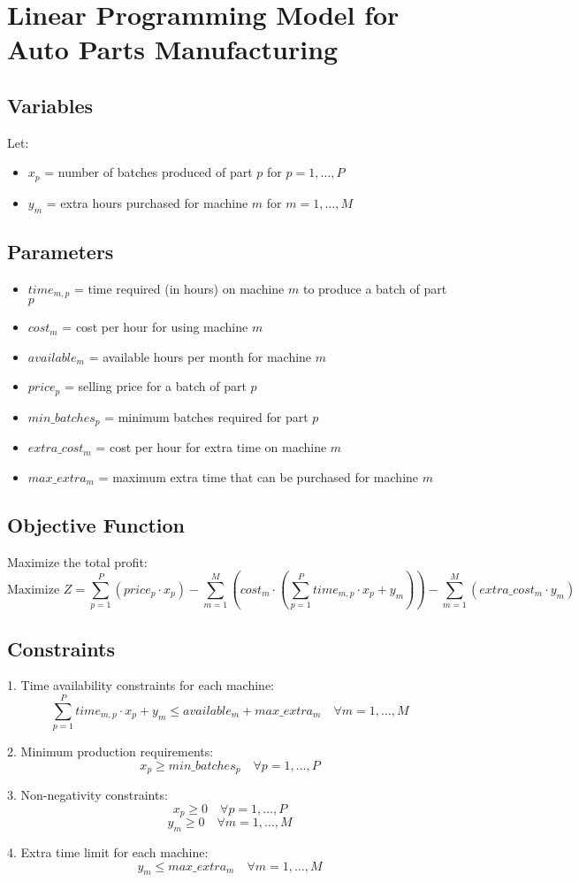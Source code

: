 \documentclass{article}
\begin{document}
\section*{Linear Programming Model for Auto Parts Manufacturing}

\subsection*{Variables}
Let:
\begin{itemize}
    \item \(x_p\) = number of batches produced of part \(p\) for \(p = 1, \ldots, P\)
    \item \(y_m\) = extra hours purchased for machine \(m\) for \(m = 1, \ldots, M\)
\end{itemize}

\subsection*{Parameters}
\begin{itemize}
    \item \(time_{m,p}\) = time required (in hours) on machine \(m\) to produce a batch of part \(p\)
    \item \(cost_m\) = cost per hour for using machine \(m\)
    \item \(available_m\) = available hours per month for machine \(m\)
    \item \(price_p\) = selling price for a batch of part \(p\)
    \item \(min\_batches_p\) = minimum batches required for part \(p\)
    \item \(extra\_cost_m\) = cost per hour for extra time on machine \(m\)
    \item \(max\_extra_m\) = maximum extra time that can be purchased for machine \(m\)
\end{itemize}

\subsection*{Objective Function}
Maximize the total profit:
\[
\text{Maximize } Z = \sum_{p=1}^{P} \left( price_p \cdot x_p \right) - \sum_{m=1}^{M} \left( cost_m \cdot ( \sum_{p=1}^{P} time_{m,p} \cdot x_p + y_m) \right) - \sum_{m=1}^{M} (extra\_cost_m \cdot y_m)
\]

\subsection*{Constraints}
1. Time availability constraints for each machine:
\[
\sum_{p=1}^{P} time_{m,p} \cdot x_p + y_m \leq available_m + max\_extra_m \quad \forall m = 1, \ldots, M
\]

2. Minimum production requirements:
\[
x_p \geq min\_batches_p \quad \forall p = 1, \ldots, P
\]

3. Non-negativity constraints:
\[
x_p \geq 0 \quad \forall p = 1, \ldots, P
\]
\[
y_m \geq 0 \quad \forall m = 1, \ldots, M
\]

4. Extra time limit for each machine:
\[
y_m \leq max\_extra_m \quad \forall m = 1, \ldots, M
\]
\end{document}
